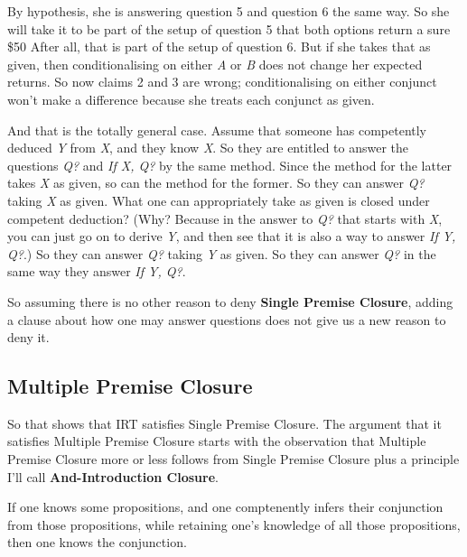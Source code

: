 \documentclass[
  11pt,
]{book}
\providecommand{\tightlist}{%
  \setlength{\itemsep}{0pt}\setlength{\parskip}{0pt}}
\begin{document}
By hypothesis, she is answering question 5 and question 6 the same way. So she will take it to be part of the setup of question 5 that both options return a sure \$50 After all, that is part of the setup of question 6. But if she takes that as given, then conditionalising on either \emph{A} or \emph{B} does not change her expected returns. So now claims 2 and 3 are wrong; conditionalising on either conjunct won't make a difference because she treats each conjunct as given.

And that is the totally general case. Assume that someone has competently deduced \emph{Y} from \emph{X}, and they know \emph{X}. So they are entitled to answer the questions \emph{Q?} and \emph{If X, Q?} by the same method. Since the method for the latter takes \emph{X} as given, so can the method for the former. So they can answer \emph{Q?} taking \emph{X} as given. What one can appropriately take as given is closed under competent deduction? (Why? Because in the answer to \emph{Q?} that starts with \emph{X}, you can just go on to derive \emph{Y}, and then see that it is also a way to answer \emph{If Y, Q?}.) So they can answer \emph{Q?} taking \emph{Y} as given. So they can answer \emph{Q?} in the same way they answer \emph{If Y, Q?}.

So assuming there is no other reason to deny \textbf{Single Premise Closure}, adding a clause about how one may answer questions does not give us a new reason to deny it.

\hypertarget{andintro}{%
\subsection{Multiple Premise Closure}\label{andintro}}

So that shows that IRT satisfies Single Premise Closure. The argument that it satisfies Multiple Premise Closure starts with the observation that Multiple Premise Closure more or less follows from Single Premise Closure plus a principle I'll call \textbf{And-Introduction Closure}.

\begin{description}
\tightlist
\item[And-Introduction Closure]
If one knows some propositions, and one comptenently infers their conjunction from those propositions, while retaining one's knowledge of all those propositions, then one knows the conjunction.
\end{description}
\end{document}
